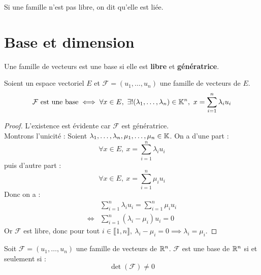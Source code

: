 \begin{remark}
	Si une famille n'est pas libre, on dit qu'elle est liée.
\end{remark}

\section{Base et dimension}
\begin{definition}[Base]
	Une famille de vecteurs est une base si elle est \textbf{libre} et \textbf{génératrice}.
\end{definition}

\begin{proposition}
	Soient un espace vectoriel $E$ et $\mathcal{F} = (u_1, \ldots, u_n)$ une famille de vecteurs de $E$.
	\[ 
	\mathcal{F} \text{ est une base} \iff 
	\forall x \in E,\ \exists ! (\lambda_1, \ldots, \lambda_n) \in \mathbb{K}^n,\ x = \sum_{i = 1}^n \lambda_i u_i
	\]
\end{proposition}

\begin{proof}
	L'existence est évidente car $\mathcal{F}$ est génératrice. 
	\\
	Montrons l'unicité : Soient $\lambda_1, \ldots, \lambda_n, \mu_1, \ldots, \mu_n \in \mathbb{K}$.
	On a d'une part :
	\[ \forall x \in E,\ x = \sum_{i=1}^{n} \lambda_i u_i \]
	puis d'autre part :
	\[ \forall x \in E,\ x = \sum_{i=1}^{n} \mu_i u_i \]
	Donc on a :
	\begin{align*}
		&\sum_{i=1}^{n} \lambda_i u_i = \sum_{i=1}^{n} \mu_i u_i \\
		\iff &\sum_{i=1}^{n} (\lambda_i - \mu_i) u_i = 0 
	\end{align*}
	Or $\mathcal{F}$ est libre, donc pour tout $i \in \llbracket 1, n \rrbracket,\ \lambda_i - \mu_i = 0 \implies \lambda_i = \mu_i$.
\end{proof}

\begin{proposition}
	Soit $\mathcal{F} = (u_1, \ldots, u_n)$ une famille de vecteurs de $\mathbb{R}^n$. $\mathcal{F}$ est une base de $\mathbb{R}^n$ si et seulement si :
	\[ \det(\mathcal{F}) \neq 0 \]
\end{proposition}

